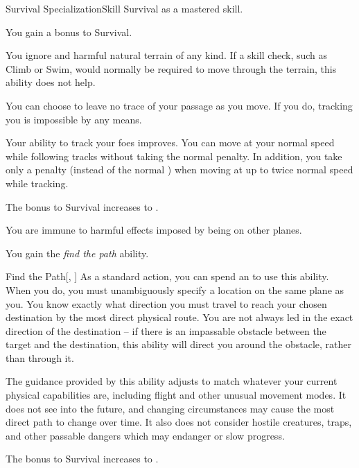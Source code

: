     \begin{feat}{Survival Specialization}{Skill}
        \featpre Survival as a mastered skill.

         You gain a  bonus to Survival.

         You ignore  and harmful natural terrain of any kind.
        If a skill check, such as Climb or Swim, would normally be required to move through the terrain, this ability does not help.

         You can choose to leave no trace of your passage as you move.
        If you do, tracking you is impossible by any  means.

        Your ability to track your foes improves.
        You can move at your normal speed while following tracks without taking the normal  penalty.
        In addition, you take only a  penalty (instead of the normal ) when moving at up to twice normal speed while tracking.

         The bonus to Survival increases to .

         You are immune to harmful effects imposed by being on other planes.

         You gain the \textit{find the path} ability.
        \begin{ability}{Find the Path}[, ]
            As a standard action, you can spend an  to use this ability.
            When you do, you must unambiguously specify a location on the same plane as you.
            You know exactly what direction you must travel to reach your chosen destination by the most direct physical route.
            You are not always led in the exact direction of the destination -- if there is an impassable obstacle between the target and the destination, this ability will direct you around the obstacle, rather than through it.

            The guidance provided by this ability adjusts to match whatever your current physical capabilities are, including flight and other unusual movement modes. It does not see into the future, and changing circumstances may cause the most direct path to change over time.
            It also does not consider hostile creatures, traps, and other passable dangers which may endanger or slow progress.
        \end{ability}

         The bonus to Survival increases to .
    \end{feat}

